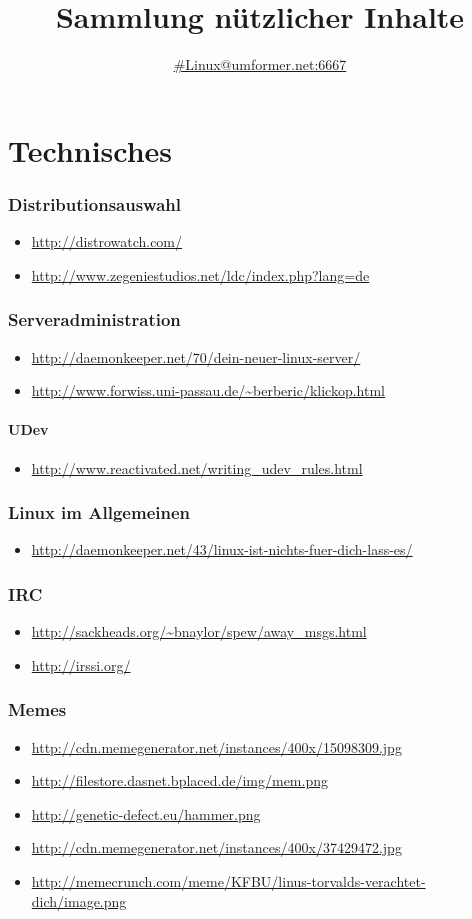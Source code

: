\documentclass[oneside,12pt,a4paper]{scrartcl}
\title{Sammlung nützlicher Inhalte}
\author{\href{http://chat.mibbit.com/?channel=\%23linux\&nick=your_nick_here\&server=umformer.net\&autoConnect=true}{\#Linux@umformer.net:6667}}
\newcommand{\linkitem}[1]{\item \url{#1}}
\begin{document}
\maketitle

\tableofcontents
\clearpage

\part{Technisches}
\section{Distributionsauswahl}
\begin{itemize}
\linkitem{http://distrowatch.com/}
\linkitem{http://www.zegeniestudios.net/ldc/index.php?lang=de}
\end{itemize}


\section{Serveradministration}
\begin{itemize}
\linkitem{http://daemonkeeper.net/70/dein-neuer-linux-server/}
\linkitem{http://www.forwiss.uni-passau.de/~berberic/klickop.html}
\end{itemize}
	\subsection{UDev}
	\begin{itemize}
	\linkitem{http://www.reactivated.net/writing_udev_rules.html}
	\end{itemize}

\section{Linux im Allgemeinen}
\begin{itemize}
\linkitem{http://daemonkeeper.net/43/linux-ist-nichts-fuer-dich-lass-es/}
\end{itemize}

\section{IRC}
\begin{itemize}
\linkitem{http://sackheads.org/~bnaylor/spew/away_msgs.html}
\linkitem{http://irssi.org/}
\end{itemize}

\section{Memes}
\begin{itemize}
\linkitem{http://cdn.memegenerator.net/instances/400x/15098309.jpg}
\linkitem{http://filestore.dasnet.bplaced.de/img/mem.png}
\linkitem{http://genetic-defect.eu/hammer.png}
\linkitem{http://cdn.memegenerator.net/instances/400x/37429472.jpg}
\linkitem{http://memecrunch.com/meme/KFBU/linus-torvalds-verachtet-dich/image.png}
\end{itemize}
\end{document}
